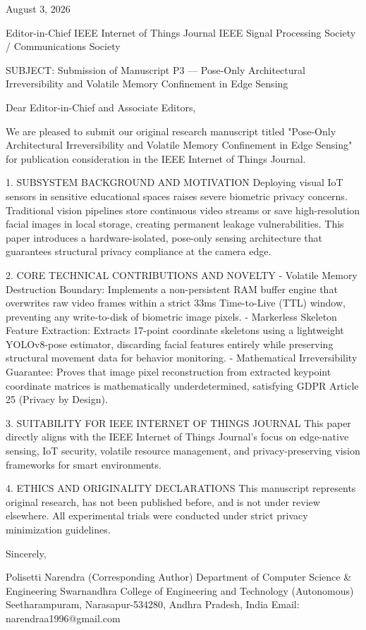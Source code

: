 August 3, 2026

Editor-in-Chief
IEEE Internet of Things Journal
IEEE Signal Processing Society / Communications Society

SUBJECT: Submission of Manuscript P3 — Pose-Only Architectural Irreversibility and Volatile Memory Confinement in Edge Sensing

Dear Editor-in-Chief and Associate Editors,

We are pleased to submit our original research manuscript titled "Pose-Only Architectural Irreversibility and Volatile Memory Confinement in Edge Sensing" for publication consideration in the IEEE Internet of Things Journal.

1. SUBSYSTEM BACKGROUND AND MOTIVATION
Deploying visual IoT sensors in sensitive educational spaces raises severe biometric privacy concerns. Traditional vision pipelines store continuous video streams or save high-resolution facial images in local storage, creating permanent leakage vulnerabilities. This paper introduces a hardware-isolated, pose-only sensing architecture that guarantees structural privacy compliance at the camera edge.

2. CORE TECHNICAL CONTRIBUTIONS AND NOVELTY
  - Volatile Memory Destruction Boundary: Implements a non-persistent RAM buffer engine that overwrites raw video frames within a strict 33ms Time-to-Live (TTL) window, preventing any write-to-disk of biometric image pixels.
  - Markerless Skeleton Feature Extraction: Extracts 17-point coordinate skeletons using a lightweight YOLOv8-pose estimator, discarding facial features entirely while preserving structural movement data for behavior monitoring.
  - Mathematical Irreversibility Guarantee: Proves that image pixel reconstruction from extracted keypoint coordinate matrices is mathematically underdetermined, satisfying GDPR Article 25 (Privacy by Design).

3. SUITABILITY FOR IEEE INTERNET OF THINGS JOURNAL
This paper directly aligns with the IEEE Internet of Things Journal's focus on edge-native sensing, IoT security, volatile resource management, and privacy-preserving vision frameworks for smart environments.

4. ETHICS AND ORIGINALITY DECLARATIONS
This manuscript represents original research, has not been published before, and is not under review elsewhere. All experimental trials were conducted under strict privacy minimization guidelines.

Sincerely,

Polisetti Narendra (Corresponding Author)
Department of Computer Science & Engineering
Swarnandhra College of Engineering and Technology (Autonomous)
Seetharampuram, Narasapur-534280, Andhra Pradesh, India
Email: narendraa1996@gmail.com
